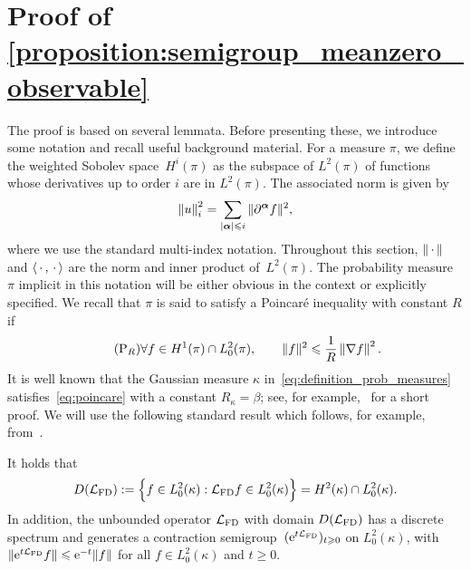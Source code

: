 \documentclass[11pt,a4paper]{article}
\begin{document}
\appendix
\section{Proof of \texorpdfstring{\cref{proposition:semigroup_meanzero_observable}}{Proposition 2.1}}%
\label{sec:auxiliary_technical_results}

The proof is based on several lemmata.
Before presenting these, we introduce some notation and recall useful background material.
For a measure $\pi$, we define the weighted Sobolev space~$H^i(\pi)$ as the subspace of $L^2(\pi)$
of functions whose derivatives up to order $i$ are in $L^2(\pi)$.
The associated norm is given by
\[
    \norm{u}_i^2 = \sum_{|\vect \alpha| \leq i} \norm*{\partial^{\vect \alpha} f}^2,
\]
where we use the standard multi-index notation.
Throughout this section, $\norm{\dummy}$ and $\ip{\dummy}{\dummy}$ are the norm and inner product of~$L^2(\pi)$.
The probability measure $\pi$ implicit in this notation will be either obvious in the context or explicitly specified.
We recall that $\pi$ is said to satisfy a Poincaré inequality with constant $R$ if
\begin{equation}
    \label{eq:poincare}
    \tag{P$_R$}
    \forall f \in H^1(\pi) \cap L^2_0(\pi), \qquad
    \norm*{f}^2 \leq \frac{1}{R} \norm{\grad f}^2.
\end{equation}
It is well known that the Gaussian measure $\kappa$ in~\eqref{eq:definition_prob_measures} satisfies~\eqref{eq:poincare} with a constant $R_{\kappa} = \beta$;
see, for example,~\cite[Lemma 2.1]{MR4071827} for a short proof.
We will use the following standard result which follows,
for example, from~\cite[Chapter 9]{lorenzi2006analytical}.
\begin{lemma}
    \label{lemma:semigroup}
    It holds that
    \[
        D(\mathcal L_{\rm FD}) := \Bigl\{ f \in L^2_0(\kappa): \mathcal L_{\rm FD} f \in L^2_0(\kappa) \Bigr\} = H^2(\kappa) \cap L^2_0(\kappa).
    \]
    In addition, the unbounded operator
    \(
        \mathcal L_{\rm FD}
    \)
    with domain $D(\mathcal L_{\rm FD})$ has a discrete spectrum and
    generates a contraction semigroup~$(\mathrm{e}^{t \mathcal L_{\rm FD}})_{t \geqslant 0}$ on $L^2_0(\kappa)$,
    with $\lVert \mathrm{e}^{t \mathcal L_{\rm FD}} f \rVert \leqslant \mathrm{e}^{-t} \lVert f \rVert$ for all $f \in L^2_0(\kappa)$ and $t \geq 0$.
\end{lemma}
\end{document}
